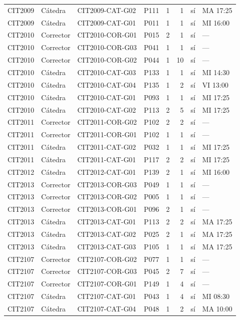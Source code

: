 \begin{longtable}{llllrrcl}
CIT2009 & Cátedra & CIT2009-CAT-G02 & P111 & 1 & 1 & sí & MA 17:25 \\
CIT2009 & Cátedra & CIT2009-CAT-G01 & P011 & 1 & 1 & sí & MI 16:00 \\
CIT2010 & Corrector & CIT2010-COR-G01 & P015 & 2 & 1 & sí & — \\
CIT2010 & Corrector & CIT2010-COR-G03 & P041 & 1 & 1 & sí & — \\
CIT2010 & Corrector & CIT2010-COR-G02 & P044 & 1 & 10 & sí & — \\
CIT2010 & Cátedra & CIT2010-CAT-G03 & P133 & 1 & 1 & sí & MI 14:30 \\
CIT2010 & Cátedra & CIT2010-CAT-G04 & P135 & 1 & 2 & sí & VI 13:00 \\
CIT2010 & Cátedra & CIT2010-CAT-G01 & P093 & 1 & 1 & sí & MI 17:25 \\
CIT2010 & Cátedra & CIT2010-CAT-G02 & P113 & 2 & 5 & sí & MI 17:25 \\
CIT2011 & Corrector & CIT2011-COR-G02 & P102 & 2 & 2 & sí & — \\
CIT2011 & Corrector & CIT2011-COR-G01 & P102 & 1 & 1 & sí & — \\
CIT2011 & Cátedra & CIT2011-CAT-G02 & P032 & 1 & 1 & sí & MI 17:25 \\
CIT2011 & Cátedra & CIT2011-CAT-G01 & P117 & 2 & 2 & sí & MI 17:25 \\
CIT2012 & Cátedra & CIT2012-CAT-G01 & P139 & 2 & 1 & sí & MI 16:00 \\
CIT2013 & Corrector & CIT2013-COR-G03 & P049 & 1 & 1 & sí & — \\
CIT2013 & Corrector & CIT2013-COR-G02 & P005 & 1 & 1 & sí & — \\
CIT2013 & Corrector & CIT2013-COR-G01 & P096 & 2 & 1 & sí & — \\
CIT2013 & Cátedra & CIT2013-CAT-G01 & P113 & 2 & 2 & sí & MA 17:25 \\
CIT2013 & Cátedra & CIT2013-CAT-G02 & P025 & 2 & 1 & sí & MA 17:25 \\
CIT2013 & Cátedra & CIT2013-CAT-G03 & P105 & 1 & 1 & sí & MA 17:25 \\
CIT2107 & Corrector & CIT2107-COR-G02 & P077 & 1 & 1 & sí & — \\
CIT2107 & Corrector & CIT2107-COR-G03 & P045 & 2 & 7 & sí & — \\
CIT2107 & Corrector & CIT2107-COR-G01 & P149 & 1 & 4 & sí & — \\
CIT2107 & Cátedra & CIT2107-CAT-G01 & P043 & 1 & 4 & sí & MI 08:30 \\
CIT2107 & Cátedra & CIT2107-CAT-G04 & P048 & 1 & 2 & sí & MA 10:00 \\

\end{longtable}

